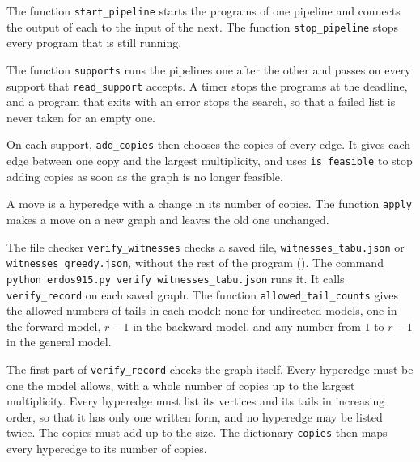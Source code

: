 
The function \texttt{start\_pipeline} starts the programs of one pipeline and connects the output of each to the input of the next. The function \texttt{stop\_pipeline} stops every program that is still running.


The function \texttt{supports} runs the pipelines one after the other and passes on every support that \texttt{read\_support} accepts. A timer stops the programs at the deadline, and a program that exits with an error stops the search, so that a failed list is never taken for an empty one.


On each support, \texttt{add\_copies} then chooses the copies of every edge. It gives each edge between one copy and the largest multiplicity, and uses \texttt{is\_feasible} to stop adding copies as soon as the graph is no longer feasible.


A move is a hyperedge with a change in its number of copies. The function \texttt{apply} makes a move on a new graph and leaves the old one unchanged.


The file checker \texttt{verify\_witnesses} checks a saved file, \texttt{witnesses\_tabu.json} or \texttt{witnesses\_greedy.json}, without the rest of the program (). The command \texttt{python erdos915.py verify witnesses\_tabu.json} runs it. It calls \texttt{verify\_record} on each saved graph. The function \texttt{allowed\_tail\_counts} gives the allowed numbers of tails in each model: none for undirected models, one in the forward model, $r-1$ in the backward model, and any number from $1$ to $r-1$ in the general model.


The first part of \texttt{verify\_record} checks the graph itself. Every hyperedge must be one the model allows, with a whole number of copies up to the largest multiplicity. Every hyperedge must list its vertices and its tails in increasing order, so that it has only one written form, and no hyperedge may be listed twice. The copies must add up to the size. The dictionary \texttt{copies} then maps every hyperedge to its number of copies.


